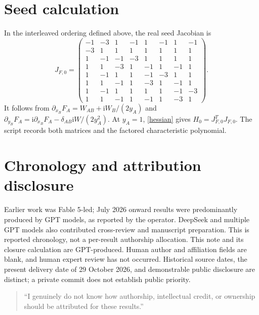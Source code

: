 \documentclass[11pt]{article}
\newcommand{\ii}{\mathrm{i}}
\begin{document}
\section{Seed calculation}\label{seed}
In the interleaved ordering defined above, the real seed Jacobian is
\begin{equation}
J_{F,0}=\begin{pmatrix}
-1&-3& 1&-1& 1&-1& 1&-1\\
-3& 1& 1& 1& 1& 1& 1& 1\\
 1&-1&-1&-3& 1& 1& 1& 1\\
 1& 1&-3& 1&-1& 1&-1& 1\\
 1&-1& 1& 1&-1&-3& 1& 1\\
 1& 1&-1& 1&-3& 1&-1& 1\\
 1&-1& 1& 1& 1& 1&-1&-3\\
 1& 1&-1& 1&-1& 1&-3& 1
\end{pmatrix}.
\end{equation}
It follows from
$\partial_{x_B}F_A=W_{AB}+\ii W_B/(2y_A)$ and
$\partial_{y_B}F_A=\ii\partial_{x_B}F_A
-\delta_{AB}\ii W/(2y_A^2)$. At $y_A=1$, \eqref{hessian} gives
$H_0=J_{F,0}^TJ_{F,0}$. The script records both matrices and the factored
characteristic polynomial.

\section*{Chronology and attribution disclosure}
Earlier work was Fable 5-led; July 2026 onward results were predominantly
produced by GPT models, as reported by the operator. DeepSeek and multiple
GPT models also contributed cross-review and manuscript preparation. This
is reported chronology, not a per-result authorship allocation. This note
and its closure calculation are GPT-produced. Human author and affiliation
fields are blank, and human expert review has not occurred. Historical
source dates, the present delivery date of 29 October 2026, and demonstrable
public disclosure are distinct; a private commit does not establish public
priority.
\begin{quote}
``I genuinely do not know how authorship, intellectual credit, or ownership should be attributed for these results.''
\end{quote}



\end{document}
